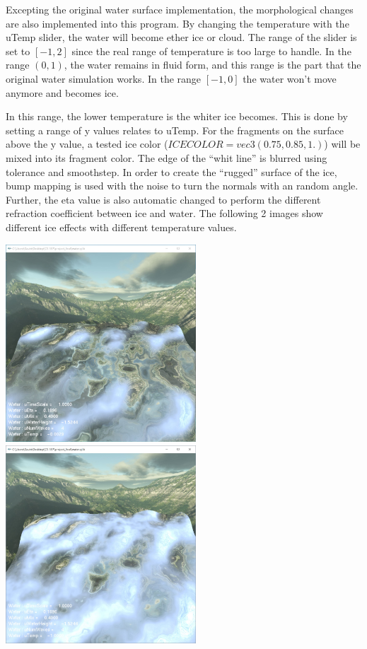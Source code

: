 \documentclass[letterpaper,14pt,titlepage,fleqn]{article}
\begin{document}
Excepting the original water surface implementation, the morphological changes are also implemented into this program. By changing the temperature with the uTemp slider, the water will become ether ice or cloud. The range of the slider is set to $[-1, 2]$ since the real range of temperature is too large to handle. In the range $(0, 1)$, the water remains in fluid form, and this range is the part that the original water simulation works. In the range $[-1, 0]$ the water won't move anymore and becomes ice. 

In this range, the lower temperature is the whiter ice becomes. This is done by setting a range of y values relates to uTemp. For the fragments on the surface above the y value, a tested ice color ($ICECOLOR = vec3( 0.75, 0.85, 1.)$) will be mixed into its fragment color. The edge of the ``whit line'' is blurred using tolerance and smoothstep. In order to create the ``rugged'' surface of the ice, bump mapping is used with the noise to turn the normals with an random angle. Further, the eta value is also automatic changed to perform the different refraction coefficient between ice and water. The following 2 images show different ice effects with different temperature values.
\begin{center}
	\includegraphics[width=2.8in]{ice1.jpg}
	\includegraphics[width=2.8in]{ice2.jpg}
\end{center}
\end{document}
